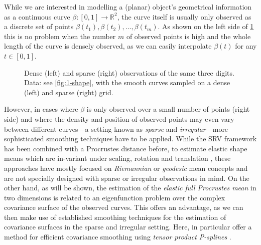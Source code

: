 While we are interested in modelling a (planar) object's geometrical information as a continuous curve $\beta : [0,1] \rightarrow \mathbb{R}^2$, the curve itself is usually only observed as a discrete set of points $\beta(t_1), \beta(t_2), \dots, \beta(t_m)$.
As shown on the left side of \cref{fig:1-sparse} this is no problem when the number $m$ of observed points is high and the whole length of the curve is densely observed, as we can easily interpolate $\beta(t)$ for any $t \in [0,1]$.
\begin{figure}
  \centering
  \begin{subfigure}{.48\textwidth}
    \centering
  \end{subfigure}\hfill%
  \begin{subfigure}{.48\textwidth}
    \centering
  \end{subfigure}
  \caption{Dense (left) and sparse (right) observations of the same three digits. Data: see \cref{fig:1-shape}, with the smooth curves sampled on a dense (left) and sparse (right) grid.}
  \label{fig:1-sparse}
\end{figure}
However, in cases where $\beta$ is only observed over a small number of points (right side) and where the density and position of observed points may even vary between different curves---a setting known as \emph{sparse} and \emph{irregular}---more sophisticated smoothing techniques have to be applied.
While the SRV framework has been combined with a Procrustes distance before, to estimate elastic shape means which are in-variant under scaling, rotation and translation \parencite[see][]{SrivastavaEtAl2011}, these approaches have mostly focused on \emph{Riemannian} or \emph{geodesic} mean concepts and are not specially designed with sparse or irregular observations in mind.
On the other hand, as will be shown, the estimation of the \emph{elastic full Procrustes mean} in two dimensions is related to an eigenfunction problem over the complex covariance surface of the observed curves.
This offers an advantage, as we can then make use of established smoothing techniques for the estimation of covariance surfaces in the sparse and irregular setting.
Here, in particular \cite{CederbaumScheiplGreven2018} offer a method for efficient covariance smoothing using \emph{tensor product P-splines} \parencite[see e.g.][Chap. 8.2]{FahrmeierEtAl2013}.


